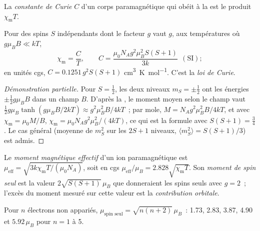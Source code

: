 \begin{definition}\label{def:b3:complex-spectra-magnetism:curie}
La \emph{constante de Curie} $C$ d'un corps
paramagnétique qui obéit à la  est le produit $\chi_{\mathrm m}T$.
\end{definition}

\begin{theorem}\label{thm:b3:complex-spectra-magnetism:curie}
Pour des spins $S$ indépendants dont le facteur $g$ vaut $g$, aux
températures où $g\mu_BB \ll kT$,
\[
  \chi_{\mathrm m} = \frac{C}{T}, \qquad C = \frac{\mu_0N_Ag^2\mu_B^2S(S+1)}{3k}\ \ (\text{SI});
\]
en unités cgs, $C = 0.1251\,g^2S(S+1)$ \unit{cm^3.K.mol^{-1}}. C'est la \emph{loi de Curie}.
\end{theorem}

\begin{proof}[Démonstration partielle]
Pour $S = \frac12$, les deux niveaux $m_S = \pm\frac12$ ont les énergies
$\pm\frac12g\mu_BB$ dans un champ $B$. D'après la , le moment moyen selon le champ vaut $\frac12g\mu_B\tanh(g\mu_BB/2kT) \approx
g^2\mu_B^2B/4kT$~; par mole, $M = N_Ag^2\mu_B^2B/4kT$, et avec $\chi_{\mathrm m} = \mu_0M/B$, $\chi_{\mathrm m} = \mu_0N_Ag^2\mu_B^2/(4kT)$,
ce qui est la formule avec $S(S+1) = \frac34$. Le cas général (moyenne de
$m_S^2$ sur les $2S + 1$ niveaux, $\langle m_S^2\rangle = S(S+1)/3$) est
admis.
\end{proof}

\begin{definition}\label{def:b3:complex-spectra-magnetism:moment}
Le \emph{moment magnétique effectif} d'un ion
paramagnétique est $\mu_{\mathrm{eff}} = \sqrt{3k\chi_{\mathrm m}T/(\mu_0N_A)}$, soit en cgs $\mu_{\mathrm{eff}}/\mu_B = 2.828\sqrt{\chi_{\mathrm m}T}$. Son
\emph{moment de spin seul} est la valeur
$2\sqrt{S(S+1)}\,\mu_B$ que donneraient les spins seuls avec $g = 2$~;
l'excès du moment mesuré sur cette valeur est la \emph{contribution orbitale}.
\end{definition}

\begin{proposition}\label{prop:b3:complex-spectra-magnetism:spin-only}
Pour $n$ électrons non appariés, $\mu_{\text{spin seul}} = \sqrt{n(n+2)}\,\mu_B$~: 1.73, 2.83, 3.87, 4.90
et $5.92\,\mu_B$ pour $n = 1$ à 5.
\end{proposition}


